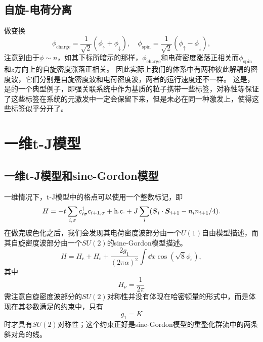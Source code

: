 \subsection{自旋-电荷分离}

做变换
\begin{equation}
    \phi_{\text{charge}} = \frac{1}{\sqrt{2}} (\phi_\uparrow + \phi_\downarrow), \quad \phi_{\text{spin}} = \frac{1}{\sqrt{2}} (\phi_\uparrow - \phi_\downarrow),
\end{equation}
注意到由于$\phi \sim n$，如其下标所暗示的那样，$\phi_\text{charge}$和电荷密度涨落正相关而$\phi_\text{spin}$和$z$方向上的自旋密度涨落正相关。
因此实际上我们的体系中有两种彼此解耦的密度波，它们分别是自旋密度波和电荷密度波，两者的运行速度还不一样。
这是，是的一个典型例子，即强关联系统中作为基质的粒子携带一些标签，对称性等保证了这些标签在系统的元激发中一定会保留下来，但是未必在同一种激发上，使得这些标签似乎分开了。

\section{一维t-J模型}

\subsection{一维t-J模型和sine-Gordon模型}

一维情况下，t-J模型中的格点可以使用一个整数标记，即
\begin{equation}
    H = - t \sum_{i, \sigma} c_{i \sigma}^\dagger c_{i+1, \sigma} + \text{h.c.} + J \sum_i (\vb*{S}_i \cdot \vb*{S}_{i+1} - n_i n_{i+1} / 4).
\end{equation}
在做完玻色化之后，我们会发现其电荷密度波部分由一个$U(1)$自由模型描述，而其自旋密度波部分由一个$SU(2)$的sine-Gordon模型描述。
\begin{equation}
    H = H_\text{c} + H_\text{s} + \frac{2g_1}{(2\pi \alpha)^2} \int \dd{x} \cos(\sqrt{8} \phi_\text{s}),
\end{equation}
其中
\begin{equation}
    H_\nu = \frac{1}{2\pi}
\end{equation}
需注意自旋密度波部分的$SU(2)$对称性并没有体现在哈密顿量的形式中，而是体现在其参数满足的约束中，只有
\begin{equation}
    g_1 = K
\end{equation}
时才具有$SU(2)$对称性；这个约束正好是sine-Gordon模型的重整化群流中的两条斜对角的线。


